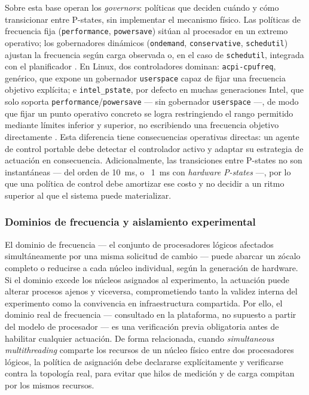 \documentclass[12pt,oneside,spanish]{book}
\begin{document}
Sobre esta base operan los \textit{governors}: políticas que deciden cuándo y cómo transicionar entre P-states, sin implementar el mecanismo físico. Las políticas de frecuencia fija (\texttt{performance}, \texttt{powersave}) sitúan al procesador en un extremo operativo; los gobernadores dinámicos (\texttt{ondemand}, \texttt{conservative}, \texttt{schedutil}) ajustan la frecuencia según carga observada o, en el caso de \texttt{schedutil}, integrada con el planificador \cite{Hebbar2022}. En Linux, dos controladores dominan: \texttt{acpi-cpufreq}, genérico, que expone un gobernador \texttt{userspace} capaz de fijar una frecuencia objetivo explícita; e \texttt{intel\_pstate}, por defecto en muchas generaciones Intel, que solo soporta \texttt{performance}/\texttt{powersave} --- sin gobernador \texttt{userspace} ---, de modo que fijar un punto operativo concreto se logra restringiendo el rango permitido mediante límites inferior y superior, no escribiendo una frecuencia objetivo directamente \cite{Hebbar2022}. Esta diferencia tiene consecuencias operativas directas: un agente de control portable debe detectar el controlador activo y adaptar su estrategia de actuación en consecuencia. Adicionalmente, las transiciones entre P-states no son instantáneas --- del orden de 10~ms, o ~1~ms con \textit{hardware P-states} \cite{Hebbar2022} ---, por lo que una política de control debe amortizar ese costo y no decidir a un ritmo superior al que el sistema puede materializar.

\subsubsection{Dominios de frecuencia y aislamiento experimental}
\label{sec:dominios}

El dominio de frecuencia --- el conjunto de procesadores lógicos afectados simultáneamente por una misma solicitud de cambio --- puede abarcar un zócalo completo o reducirse a cada núcleo individual, según la generación de hardware. Si el dominio excede los núcleos asignados al experimento, la actuación puede alterar procesos ajenos y viceversa, comprometiendo tanto la validez interna del experimento como la convivencia en infraestructura compartida. Por ello, el dominio real de frecuencia --- consultado en la plataforma, no supuesto a partir del modelo de procesador --- es una verificación previa obligatoria antes de habilitar cualquier actuación. De forma relacionada, cuando \textit{simultaneous multithreading} comparte los recursos de un núcleo físico entre dos procesadores lógicos, la política de asignación debe declararse explícitamente y verificarse contra la topología real, para evitar que hilos de medición y de carga compitan por los mismos recursos.
\end{document}
